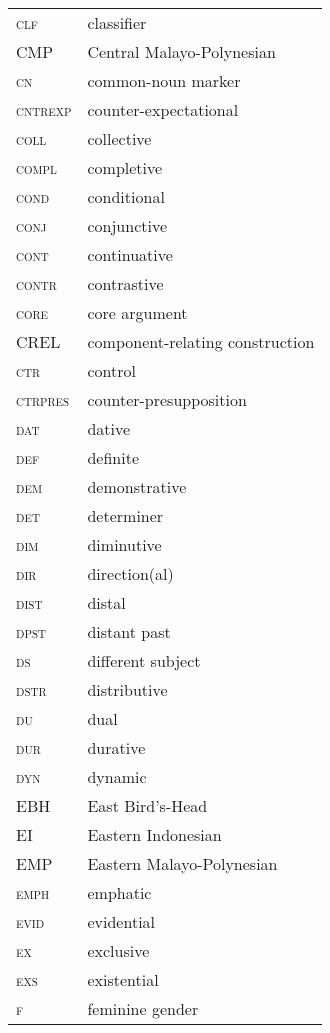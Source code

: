 \begin{longtable}{l l}
 \textsc{clf}  & classifier \\
 \textsc{CMP}  & Central Malayo-Polynesian \\
 \textsc{cn}  & common-noun marker \\
 \textsc{cntrexp}  & counter-expectational \\
 \textsc{coll}  & collective \\
 \textsc{compl}  & completive \\
 \textsc{cond}  & conditional \\
 \textsc{conj}  & conjunctive \\
 \textsc{cont}  & continuative \\
 \textsc{contr}  & contrastive \\
 \textsc{core}  & core argument \\
 \textsc{CREL}  & component-relating construction \\
 \textsc{ctr}  & control \\
 \textsc{ctrpres}  & counter-presupposition \\
 \textsc{dat}  & dative \\
 \textsc{def}  & definite \\
 \textsc{dem}  & demonstrative \\
 \textsc{det}  & determiner \\
 \textsc{dim}  & diminutive \\
 \textsc{dir}  & direction(al) \\
 \textsc{dist}  & distal \\
 \textsc{dpst}  & distant past \\
 \textsc{ds}  & different subject \\
 \textsc{dstr}  & distributive \\
 \textsc{du}  & dual \\
 \textsc{dur}  & durative \\
 \textsc{dyn}  & dynamic \\
 \textsc{EBH}  & East Bird's-Head \\
 \textsc{EI}  & Eastern Indonesian \\
 \textsc{EMP}  & Eastern Malayo-Polynesian \\
 \textsc{emph}  & emphatic \\
 \textsc{evid}  & evidential \\
 \textsc{ex}  & exclusive \\
 \textsc{exs}  & existential \\
 \textsc{f}  & feminine gender \\

\end{longtable}
